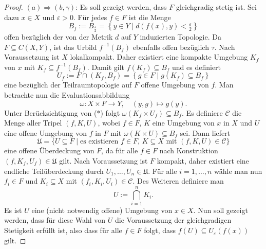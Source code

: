 \begin{proof}
  $(a) \Rightarrow (b, \gamma)$:
  Es soll gezeigt werden, dass $F$ gleichgradig stetig ist.
  Sei dazu $x \in X$ und $\varepsilon > 0$.
  Für jedes $f \in F$ ist die Menge
  \begin{displaymath}
    B_f := B_{\frac{\varepsilon}{2}} = \left\{ y \in Y \mid d(f(x),y) < \tfrac{\varepsilon}{2}\right\} 
  \end{displaymath}
  offen bezüglich der von der Metrik $d$ auf $Y$ induzierten Topologie.
  Da $F \subseteq C(X,Y)$, ist das Urbild $f^{-1}(B_f)$ ebenfalls offen bezüglich $\tau$.
  Nach Voraussetzung ist $X$ lokalkompakt.
  Daher existiert eine kompakte Umgebung $K_f$ von $x$ mit $K_f \subseteq f^{-1}(B_f)$.
  Damit gilt $f(K_f) \subseteq B_f$ und es definiert
  \begin{displaymath}
    U_f := F \cap (K_f, B_f) = \left\{g \in F \mid g(K_f) \subseteq B_f \right\} \tag{$\ast$}
  \end{displaymath}
  eine bezüglich der Teilraumtopologie auf $F$ offene Umgebung von $f$.
  Man betrachte nun die Evaluationsabbildung 
  \begin{displaymath}
    \omega: X \times F \to Y, \quad (y,g) \mapsto g(y).
  \end{displaymath}
  Unter Berücksichtigung von ($\ast$) folgt $\omega(K_f \times U_f) \subseteq B_f$.
  Es definiere $\mathcal{C}$ die Menge aller Tripel $(f,K,U)$, wobei $f \in F$, $K$ eine Umgebung von $x$ in $X$ und $U$ eine offene Umgebung von $f$ in $F$ mit $\omega(K \times U) \subseteq B_f$ sei.
  Dann liefert
  \begin{displaymath}
    \mathfrak{U} = \{ U \subseteq F \mid \text{es existieren $f \in F$, $K \subseteq X$ mit $(f,K,U) \in \mathcal C$} \}
  \end{displaymath}
  eine offene Überdeckung von $F$, da für alle $f \in F$ nach Konstruktion $(f,K_f,U_f) \in \mathfrak{U}$ gilt.
  Nach Voraussetzung ist $F$ kompakt, daher existiert eine endliche Teilüberdeckung durch $U_1,\dots,U_n \in \mathfrak{U}$.
  Für alle $i = 1,\dots,n$ wähle man nun $f_i \in F$ und $K_i \subseteq X$ mit $(f_i, K_i, U_i) \in \mathcal{C}$.
  Des Weiteren definiere man 
  \begin{displaymath}
    U := \bigcap_{i = 1}^n K_i.
  \end{displaymath}
  Es ist $U$ eine (nicht notwendig offene) Umgebung von $x \in X$.
  Nun soll gezeigt werden, dass für diese Wahl von $U$ die Voraussetzung der gleichgradigen Stetigkeit erfüllt ist, also dass für alle $f \in F$ folgt, dass $f(U) \subseteq U_\varepsilon(f(x))$ gilt.

\end{proof}

